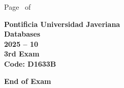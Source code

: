 \documentclass[11pt, addpoints, answers]{exam}\usepackage[utf8]{inputenc}
\begin{document}
\begin{coverpages}
\begin{center}
			\vspace{3mm}
			\leavevmode \hspace{5mm} 
		\end{center}
	\end{coverpages}

	\footer{} {Page \thepage\ of \numpages} {}

	\centering
	\textbf{\Large Pontificia Universidad Javeriana}\\
	\textbf{\Large Databases} \\
	\textbf{\large 2025 -- 10} \\
	\textbf{\large 3rd Exam} \\
	\textbf{Code: D1633B}


	\begin{questions}
		
		
		
		
		
		
		
		
		
		
		
		
		
		
		
		
		
		
		
		
	\end{questions}

	\vspace{5mm}
	\noindent \textbf{End of Exam}
\end{document}
